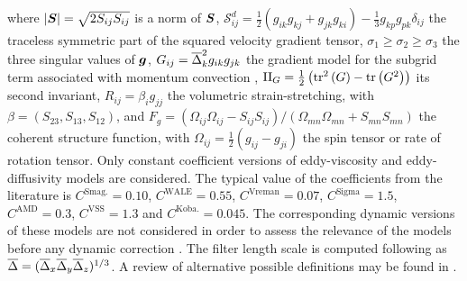 where 
$\left|\vt{S}\right|=\sqrt{2 S_{ij} S_{ij}}$ is a norm of $\vt{S}$,
$\mathcal{S}^d_{ij} = \tfrac{1}{2}\left( g_{ik}g_{kj} + g_{jk}g_{ki} \right) - \tfrac{1}{3}g_{kp}g_{pk} \delta_{ij}$ the traceless symmetric part of the squared velocity gradient tensor, 
$\sigma_1 \geq \sigma_2 \geq \sigma_3$ the three singular values of $\vv{g}$,
$G_{ij} = \f{\Delta}_k^2 g_{ik} g_{jk}$ the gradient model for the subgrid term associated with momentum convection \cite{leonard74},
$\mathrm{II}_G = \tfrac{1}{2}\left(\tr^2\left(G\right) - \tr\left(G^2\right)\right)$ its second invariant,
$R_{ij}=\beta_i g_{jj}$ the volumetric strain-stretching, with $\beta=\left(S_{23}, S_{13}, S_{12}\right)$,
and $F_g = \left(\varOmega_{ij}\varOmega_{ij} - S_{ij}S_{ij}\right)/\left(\varOmega_{mn}\varOmega_{mn} + S_{mn}S_{mn}\right)$
the coherent structure function, with $\varOmega_{ij} = \tfrac{1}{2}\left( g_{ij} - g_{ji} \right)$ the spin tensor or rate of rotation tensor.
Only constant coefficient versions of eddy-viscosity and eddy-diffusivity models are considered.
The typical value of the coefficients from the literature is
$C^{\mathrm{Smag.}} = 0.10$, $C^{\mathrm{WALE}} = 0.55$, $C^{\mathrm{Vreman}}=0.07$, $C^{\mathrm{Sigma}}=1.5$, $C^{\mathrm{AMD}}=0.3$, $C^{\mathrm{VSS}}=1.3$ and $C^{\mathrm{Koba.}}=0.045$.
The corresponding dynamic versions of these models are not considered
in order to assess the relevance of the models before any dynamic correction \cite{germano91, lilly1992proposed, park2006dynamic}.
The filter length scale is computed following \cite{deardorff1970numerical} as  $\f{\Delta}=(\f{\Delta}_x\f{\Delta}_y\f{\Delta}_z)^{1/3}$.
A review of alternative possible definitions may be found in \cite{trias2017new}.

